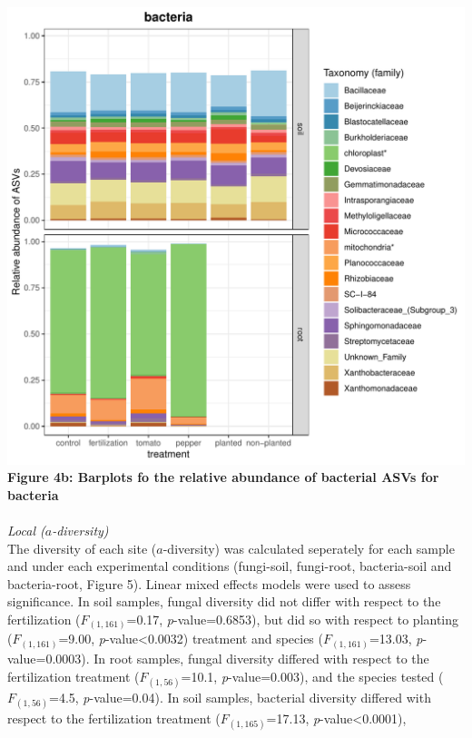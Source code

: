 \documentclass[11pt,]{article}
\begin{document}
\hspace*{0.333em} ~\\
\includegraphics[width=7.29167in]{../figures/Figure4_FAMILY_barplots_bacteria.pdf}\\
\textbf{Figure 4b: Barplots fo the relative abundance of bacterial ASVs
for bacteria}\\
\hspace*{0.333em} ~\\
\emph{Local (\(a\)-diversity)}\\
The diversity of each site (\(a\)-diversity) was calculated seperately
for each sample and under each experimental conditions (fungi-soil,
fungi-root, bacteria-soil and bacteria-root, Figure 5). Linear mixed
effects models were used to assess significance. In soil samples, fungal
diversity did not differ with respect to the fertilization
(\(F_{(1,161)}\)=0.17, \emph{p}-value=0.6853), but did so with respect
to planting (\(F_{(1,161)}\)=9.00, \emph{p}-value\textless{}0.0032)
treatment and species (\(F_{(1,161)}\)=13.03, \emph{p}-value=0.0003). In
root samples, fungal diversity differed with respect to the
fertilization treatment (\(F_{(1,56)}\)=10.1, \emph{p}-value=0.003), and
the species tested (\(F_{(1,56)}\)=4.5, \emph{p}-value=0.04). In soil
samples, bacterial diversity differed with respect to the fertilization
treatment (\(F_{(1,165)}\)=17.13, \emph{p}-value\textless{}0.0001),
\end{document}
